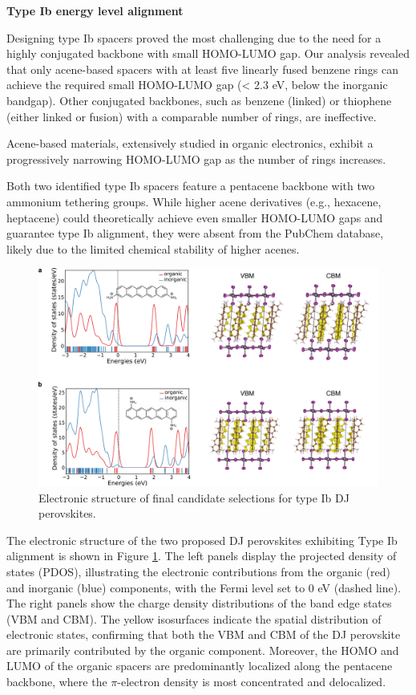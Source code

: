 \textbf{Type Ib energy level alignment}

Designing type Ib spacers proved the most challenging due to the need for a highly conjugated backbone with small HOMO-LUMO gap. Our analysis revealed that only acene-based spacers with at least five linearly fused benzene rings can achieve the required small HOMO-LUMO gap (< 2.3 eV, below the inorganic bandgap). Other conjugated backbones, such as benzene (linked) or thiophene (either linked or fusion) with a comparable number of rings, are ineffective. 

Acene-based materials, extensively studied in organic electronics\cite{RN632}, exhibit a progressively narrowing HOMO-LUMO gap as the number of rings increases. 

Both two identified type Ib spacers feature a pentacene backbone with two ammonium tethering groups. While higher acene derivatives (e.g., hexacene, heptacene) could theoretically achieve even smaller HOMO-LUMO gaps and guarantee type Ib alignment, they were absent from the PubChem database, likely due to the limited chemical stability of higher acenes. 

\begin{figure}[htbp]
    \centering
    \includegraphics[width=\textwidth]{figures/synthesis-feasibility/figure5-21.png}
    \caption{Electronic structure of final candidate selections for type Ib DJ perovskites.}
    \label{fig:figure5.21}
\end{figure}


 The electronic structure of the two proposed DJ perovskites exhibiting Type Ib alignment is shown in Figure \ref{fig:figure5.21}. The left panels display the projected density of states (PDOS), illustrating the electronic contributions from the organic (red) and inorganic (blue) components, with the Fermi level set to 0 eV (dashed line). The right panels show the charge density distributions of the band edge states (VBM and CBM). The yellow isosurfaces indicate the spatial distribution of electronic states, confirming that both the VBM and CBM of the DJ perovskite are primarily contributed by the organic component. Moreover, the HOMO and LUMO of the organic spacers are predominantly localized along the pentacene backbone, where the $\pi$-electron density is most concentrated and delocalized.

